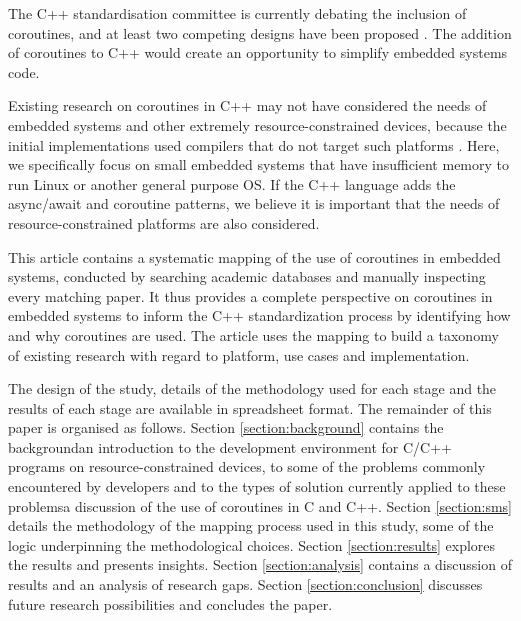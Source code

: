 The C++ standardisation committee is currently debating the inclusion of coroutines, and at least two competing designs have been proposed \cite{ISO2017, Romer2018}. The addition of coroutines to C++ would create an opportunity to simplify embedded systems code. \DIFdelbegin %

\DIFdelend Existing research on coroutines in C++ may not have considered the needs of embedded systems and other extremely resource-constrained devices, because the initial implementations used compilers that do not target such platforms \cite{Mittelette2015}. Here, we specifically focus on small embedded systems that have insufficient memory to run Linux or another general purpose OS. If the C++ language adds the async/await and coroutine patterns, we believe it is important that the needs of resource-constrained platforms are also considered.

This article contains a systematic mapping of the use of coroutines in embedded systems, conducted by searching academic databases and manually inspecting every matching paper. It thus provides a complete perspective on \DIFaddbegin {}\DIFaddend coroutines in embedded systems to inform the C++ standardization process by identifying how and why coroutines are used. The article uses the mapping to build a taxonomy of existing research with regard to platform, use cases and implementation.

The design of the study, details of the methodology used for each stage and the results of each stage are available in spreadsheet format.
The remainder of this paper is organised as follows. Section \ref{section:background} contains the background\DIFdelbegin \DIFdel{: }\DIFdelend \DIFaddbegin {}\DIFaddend an introduction to the development environment for C/C++ programs on resource-constrained devices, to some of the problems commonly encountered by developers and to the types of solution currently applied to these problems\DIFdelbegin \DIFdel{; }\DIFdelend \DIFaddbegin {}\DIFaddend a discussion of the use of coroutines in C and C++\DIFdelbegin {}\DIFdelend . Section \ref{section:sms} details the methodology of the mapping process used in this study, \DIFdelbegin {}\DIFdelend some of the logic underpinning the methodological choices\DIFaddbegin {}\DIFaddend . Section \ref{section:results} explores the results and presents insights. Section \ref{section:analysis} contains a discussion of results and an analysis of research gaps. Section \ref{section:conclusion} discusses future research possibilities and concludes the paper.


